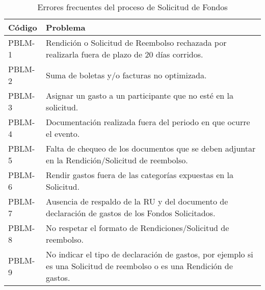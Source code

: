 \begin{table}[htbp]
    \centering
    \caption{Errores frecuentes del proceso de Solicitud de Fondos}
    \label{tab: Errores_frecuentes_Fondo}
    \begin{tabular}{| p{2.6cm}| p{12.2cm} |}
    \hline
    Código & Problema \\
    \hline \hline
    
    PBLM-1 & Rendición o Solicitud de Reembolso rechazada por realizarla fuera de plazo de 20 días corridos. \\ \hline

    PBLM-2 & Suma de boletas y/o facturas no optimizada. \\ \hline

    PBLM-3 & Asignar un gasto a un participante que no esté en la solicitud. \\ \hline

    PBLM-4 & Documentación realizada fuera del periodo en que ocurre el evento. \\ \hline

    PBLM-5 & Falta de chequeo de los documentos que se deben adjuntar en la Rendición/Solicitud de reembolso. \\ \hline

    PBLM-6 & Rendir gastos fuera de las categorías expuestas en la Solicitud. \\ \hline

    PBLM-7 & Ausencia de respaldo de la RU y del documento de declaración de gastos de los Fondos Solicitados. \\ \hline

    PBLM-8 & No respetar el formato de Rendiciones/Solicitud de reembolso. \\ \hline

    PBLM-9 & No indicar el tipo de declaración de gastos, por ejemplo si es una Solicitud de reembolso o es una Rendición de gastos. \\ \hline
    \end{tabular}
\end{table}